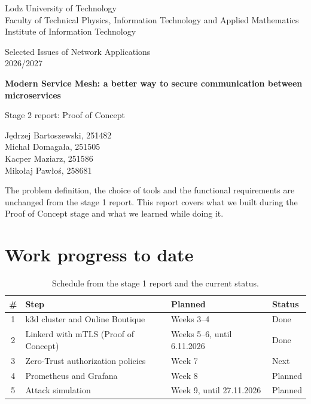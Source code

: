 \documentclass[12pt,a4paper]{article}
\begin{document}
\begin{titlepage}
  \centering
  {\large Lodz University of Technology\\
  Faculty of Technical Physics, Information Technology and Applied Mathematics\\
  Institute of Information Technology\par}
  \vspace{1.5cm}
  {\large Selected Issues of Network Applications\\2026/2027\par}
  \vspace{3cm}
  {\LARGE\bfseries Modern Service Mesh: a better way to secure communication
  between microservices\par}
  \vspace{1cm}
  {\Large Stage 2 report: Proof of Concept\par}
  \vspace{3cm}
  {\large
  Jędrzej Bartoszewski, 251482\\
  Michał Domagała, 251505\\
  Kacper Maziarz, 251586\\
  Mikołaj Pawłoś, 258681\par}
  \vfill
\end{titlepage}

The problem definition, the choice of tools and the functional requirements
are unchanged from the stage 1 report. This report covers what we built
during the Proof of Concept stage and what we learned while doing it.

\section{Work progress to date}

\begin{table}[h]
  \centering
  \begin{tabular}{clll}
    \toprule
    \# & Step & Planned & Status \\
    \midrule
    1 & k3d cluster and Online Boutique      & Weeks 3--4                 & Done    \\
    2 & Linkerd with mTLS (Proof of Concept) & Weeks 5--6, until 6.11.2026 & Done    \\
    3 & Zero-Trust authorization policies    & Week 7                     & Next    \\
    4 & Prometheus and Grafana               & Week 8                     & Planned \\
    5 & Attack simulation                    & Week 9, until 27.11.2026    & Planned \\
    \bottomrule
  \end{tabular}
  \caption{Schedule from the stage 1 report and the current status.}
\end{table}
\end{document}
